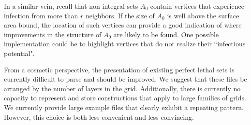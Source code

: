 In a similar vein, recall that non-integral sets $A_0$ contain vertices that experience infection from more than $r$ neighbors. If the size of $A_0$ is well above the surface area bound, the location of such vertices can provide a good indication of where improvements in the structure of $A_0$ are likely to be found. One possible implementation could be to highlight vertices that do not realize their ``infectious potential". 

From a cosmetic perspective, the presentation of existing perfect lethal sets is currently difficult to parse and should be improved. We suggest that these files be arranged by the number of layers in the grid. Additionally, there is currently no capacity to represent and store constructions that apply to large families of grids. We currently provide large example files that clearly exhibit a repeating pattern. However, this choice is both less convenient and less convincing. 







